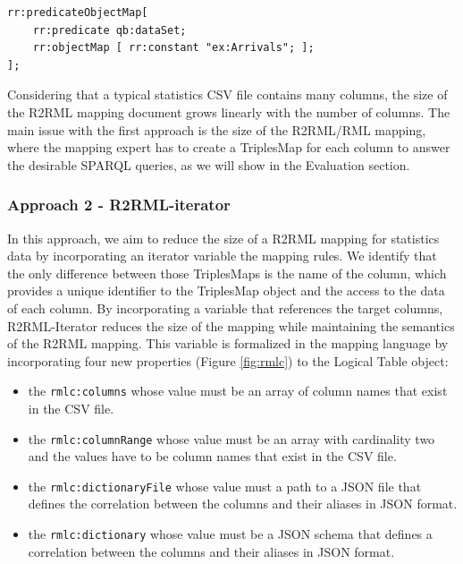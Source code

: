 \begin{lstlisting}[float,caption=Dataset mapping,frame=tlrb,label={list:dataset}, columns=fullflexible]
rr:predicateObjectMap[ 
    rr:predicate qb:dataSet; 
    rr:objectMap [ rr:constant "ex:Arrivals"; ];
];
\end{lstlisting}

Considering that a typical statistics CSV file contains many columns, the size of the R2RML mapping document grows linearly with the number of columns. The main issue with the first approach is the size of the R2RML/RML mapping, where the mapping expert has to create a TriplesMap for each column to answer the desirable SPARQL queries, as we will show in the Evaluation section.

\subsubsection{Approach 2 - R2RML-iterator}
In this approach, we aim to reduce the size of a R2RML mapping for statistics data by incorporating an iterator variable the mapping rules. We identify that the only difference between those TriplesMaps is the name of the column, which provides a unique identifier to the TriplesMap object and the access to the data of each column. By incorporating a variable that references the target columns, R2RML-Iterator reduces the size of the mapping while maintaining the semantics of the R2RML mapping. This variable is formalized in the mapping language by incorporating four new properties (Figure \ref{fig:rmlc}) to the Logical Table object:

\begin{itemize}
\item the \texttt{rmlc:columns} whose value must be an array of column names that exist in the CSV file.
\item the \texttt{rmlc:columnRange} whose value must be an array with cardinality two and the values have to be column names that exist in the CSV file.
\item the \texttt{rmlc:dictionaryFile} whose value must a path to a JSON file that defines the correlation between the columns and their aliases in JSON format.
\item the \texttt{rmlc:dictionary} whose value must be a JSON schema that defines a correlation between the columns and their aliases in JSON format.
\end{itemize}

